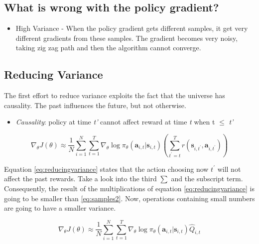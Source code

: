 \documentclass[]{article}
\begin{document}
\subsection*{What is wrong with the policy gradient?}%
\label{sub:What is wrong with the policy gradient?}

\begin{itemize}
    \item  High Variance - When the policy gradient gets different samples, it get very different gradients from
        these samples. The gradient becomes very noisy, taking zig zag path and then the algorithm cannot converge.
\end{itemize}


\subsection*{Reducing Variance}%
\label{sub:Reducing Variance}

\par The first effort to reduce variance exploits the fact that the universe has causality. The past influences the
future, but not otherwise.
\begin{itemize}
    \item \textit{Causality}: policy at time \textit{t'} cannot affect reward at time \textit{t} when t $\leq$
        \textit{t'}
\end{itemize}

\begin{equation}
    \label{eq:reducingvariance}
    \nabla_{\theta} J(\theta) \approx \frac{1}{N} \sum_{i=1}^{N} \sum_{t=1}^{T} \nabla_{\theta} \log
\pi_{\theta}\left(\mathbf{a}_{i, t} | \mathbf{s}_{i, t}\right)\left(\sum_{\left.t^{\prime} = t\right.}^{T}
    r\left(\mathbf{s}_{i, t^{\prime}}, \mathbf{a}_{i, t^{\prime}}\right)\right) 
\end{equation}


Equation \eqref{eq:reducingvariance} states that the action choosing now $t^{\prime}$ will not affect the past rewards.
Take a look into the third $\sum$ and the subscript term. Consequently, the result of the multiplications of equation
\eqref{eq:reducingvariance} is going to be smaller than \eqref{eq:samples2}. Now, operations containing small numbers
are going to have a smaller variance. 

\begin{equation}\nabla_{\theta} J(\theta) \approx \frac{1}{N} \sum_{i=1}^{N} \sum_{t=1}^{T} \nabla_{\theta} \log \pi_{\theta}\left(\mathbf{a}_{i, t} | \mathbf{s}_{i, t}\right) \hat{Q}_{i, t}\end{equation}
\end{document}
